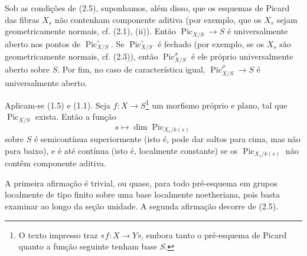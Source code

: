  Sob as condições de (2.5), suponhamos, além disso, que os
esquemas de Picard das fibras $X_s$ não contenham componente aditiva (por
exemplo, que os $X_s$ sejam geometricamente normais, cf. (2.1), (ii)). Então
$\operatorname{Pic}_{X/S}\longrightarrow S$ é universalmente aberto nos pontos
de $\operatorname{Pic}_{X/S}^\circ$. Se
$\operatorname{Pic}_{X/S}^\circ$ é fechado (por exemplo, se os $X_s$ são
geometricamente normais, cf. (2.3)), então
$\operatorname{Pic}_{X/S}^\sigma$ é ele próprio universalmente aberto sobre
$S$. Por fim, no caso de característica igual,
$\operatorname{Pic}_{X/S}^\rho\longrightarrow S$ é universalmente aberto.

Aplicam-se (1.5) e (1.1).
 Seja $f:X\longrightarrow S$\footnote{O texto impresso
traz «$f:X\longrightarrow Y$», embora tanto o pré-esquema de Picard quanto a
função seguinte tenham base $S$.} um morfismo próprio e plano, tal que
$\operatorname{Pic}_{X/S}$ exista. Então a função
\[
s\longmapsto\dim\operatorname{Pic}_{X_s/k(s)}
\]
sobre $S$ é semicontínua superiormente (isto é, pode dar saltos para cima, mas
não para baixo), e é até contínua (isto é, localmente constante) se os
$\operatorname{Pic}_{X_s/k(s)}$ não contêm componente aditiva.

A primeira afirmação é trivial, ou quase, para todo pré-esquema em grupos
localmente de tipo finito sobre uma base localmente noetheriana, pois basta
examinar ao longo da seção unidade. A segunda afirmação decorre de (2.5).

